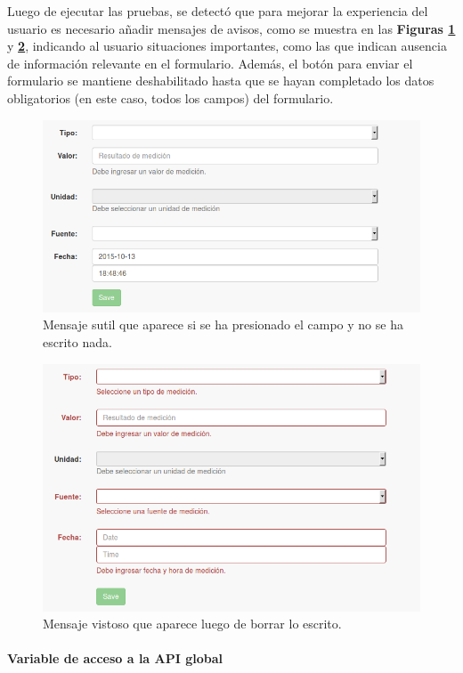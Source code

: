 Luego de ejecutar las pruebas, se detectó que para mejorar la experiencia del usuario es necesario añadir mensajes de avisos, como se muestra en las \textbf{Figuras \ref{msj_presiona_no_escribe}} y \textbf{\ref{msj_escribir_borrar}}, indicando al usuario situaciones importantes, como las que indican ausencia de información relevante en el formulario.
Además, el botón para enviar el formulario se mantiene deshabilitado hasta que se hayan completado los datos obligatorios (en este caso, todos los campos) del formulario.


 \begin{figure}[h]
  \centering
  \includegraphics[width=.8\textwidth]{img/3-presiona_no_escribe}
  \caption{Mensaje sutil que aparece si se ha presionado el campo y no se ha escrito nada.}
  \label{msj_presiona_no_escribe}
\end{figure}

\begin{figure}[h]
  \centering
  \includegraphics[width=.8\textwidth]{img/3-escribir_borrar}
  \caption{Mensaje vistoso que aparece luego de borrar lo escrito.}
  \label{msj_escribir_borrar}
\end{figure}

\clearpage

\paragraph{Variable de acceso a la API global}

